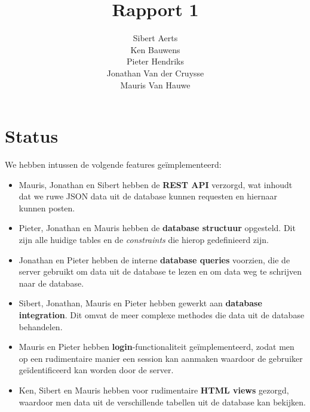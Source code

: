 \documentclass[12pt,a4paper]{article}
\begin{document}
\title{Rapport 1}
\author{Sibert Aerts \\ Ken Bauwens \\ Pieter Hendriks \\ Jonathan Van der Cruysse \\ Mauris Van Hauwe}
\maketitle

\setlength{\parindent}{0mm}

\newcommand{\code}[1]{\texttt{#1}}
% 
\newcommand{\CS}{{C\#}}
\lstset{language=[Sharp]C,basicstyle=\ttfamily}


\section{Status}

We hebben intussen de volgende features ge\"implementeerd:

\begin{itemize}

\item Mauris, Jonathan en Sibert hebben de \textbf{REST API} verzorgd, wat 
inhoudt dat we ruwe JSON data uit de database kunnen requesten en hiernaar 
kunnen posten.

\item Pieter, Jonathan en Mauris hebben de \textbf{database structuur} 
opgesteld. Dit zijn alle huidige tables en de \textit{constraints} die hierop
gedefinieerd zijn.

\item Jonathan en Pieter hebben de interne \textbf{database queries} voorzien, 
die de server gebruikt om data uit de database te lezen en om data weg te 
schrijven naar de database.

\item Sibert, Jonathan, Mauris en Pieter hebben gewerkt aan \textbf{database 
integration}. Dit omvat de meer complexe methodes die data uit de database 
behandelen.

\item Mauris en Pieter hebben \textbf{login}-functionaliteit ge\"implementeerd, 
zodat men op een rudimentaire manier een session kan aanmaken waardoor de 
gebruiker ge\"identificeerd kan worden door de server. 

\item Ken, Sibert en Mauris hebben voor rudimentaire \textbf{HTML views} 
gezorgd, waardoor men data uit de verschillende tabellen uit de database kan 
bekijken.

\end{itemize}
\end{document}
